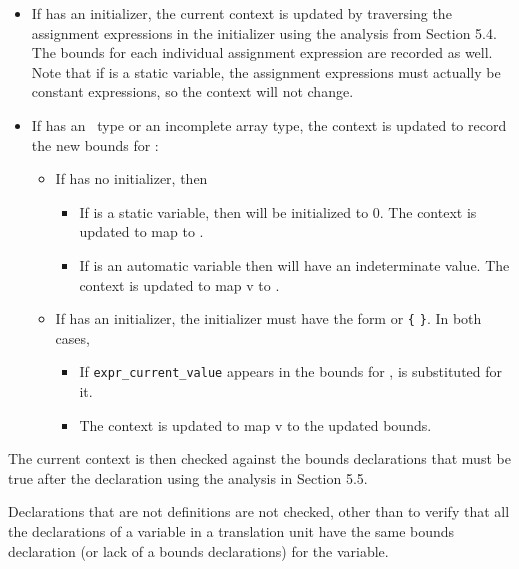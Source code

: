 \begin{itemize}
\item
  If  has an initializer, the current context is updated by
  traversing the assignment expressions in the initializer using the
  analysis from Section 5.4. The bounds for each individual assignment
  expression are recorded as well. Note that if  is a static
  variable, the assignment expressions must actually be constant
  expressions, so the context will not change.
\item
  If  has an \arrayptr\ type or an incomplete array
  type, the context is updated to record the new bounds for :

  \begin{itemize}
  \item
    If  has no initializer, then

    \begin{itemize}
    \item
      If  is a static variable, then  will be
      initialized to 0. The context is updated to map  to
      \boundsany.
    \item
      If  is an automatic variable then  will have an
      indeterminate value. The context is updated to map v to
      \boundsnone.
    \end{itemize}
  \item
    If  has an initializer, the initializer must have the form
     or \texttt{\{}  \texttt{\}}. In both cases,

    \begin{itemize}
    \item
      If \texttt{expr\_current\_value} appears in the bounds for
      ,  is substituted for it.
    \item
      The context is updated to map v to the updated bounds.
    \end{itemize}
  \end{itemize}
\end{itemize}

The current context is then checked against the bounds declarations that
must be true after the declaration using the analysis in Section 5.5.

Declarations that are not definitions are not checked, other than to
verify that all the declarations of a variable in a translation unit
have the same bounds declaration (or lack of a bounds declarations) for
the variable.

